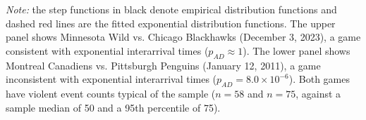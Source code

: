 \parbox{\textwidth}{
\footnotesize
\textit{Note:} the step functions in black denote empirical distribution functions and dashed red lines are the fitted exponential distribution functions. The upper panel shows Minnesota Wild vs. Chicago Blackhawks (December 3, 2023), a game consistent with exponential interarrival times ($p_{AD} \approx 1$). The lower panel shows Montreal Canadiens vs. Pittsburgh Penguins (January 12, 2011), a game inconsistent with exponential interarrival times ($p_{AD} = 8.0 \times 10^{-6}$). Both games have violent event counts typical of the sample ($n = 58$ and $n = 75$, against a sample median of 50 and a 95th percentile of 75).
}
